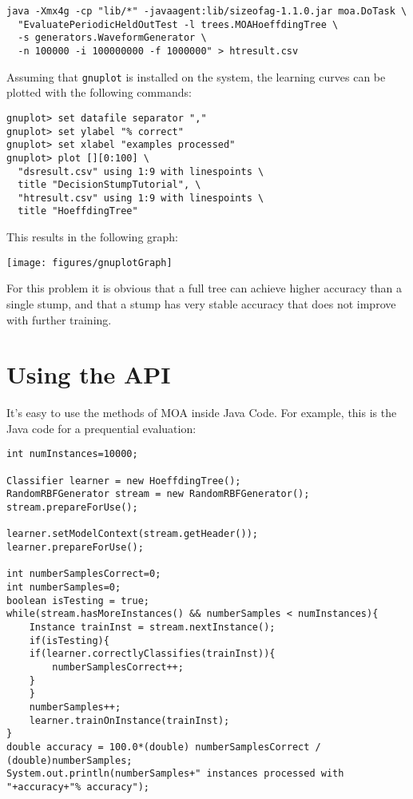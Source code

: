\documentclass[a4paper,12pt,twoside]{book}
\begin{document}
\begin{footnotesize}\begin{verbatim}
java -Xmx4g -cp "lib/*" -javaagent:lib/sizeofag-1.1.0.jar moa.DoTask \
  "EvaluatePeriodicHeldOutTest -l trees.MOAHoeffdingTree \
  -s generators.WaveformGenerator \
  -n 100000 -i 100000000 -f 1000000" > htresult.csv
\end{verbatim}\end{footnotesize}

Assuming that \verb+gnuplot+ is installed on the system, the learning curves can be plotted with the following commands:

\begin{footnotesize}\begin{verbatim}
gnuplot> set datafile separator ","
gnuplot> set ylabel "% correct"
gnuplot> set xlabel "examples processed"
gnuplot> plot [][0:100] \
  "dsresult.csv" using 1:9 with linespoints \
  title "DecisionStumpTutorial", \
  "htresult.csv" using 1:9 with linespoints \
  title "HoeffdingTree"
\end{verbatim}\end{footnotesize}

This results in the following graph:

\texttt{[image: figures/gnuplotGraph]}

For this problem it is obvious that a full tree can achieve higher accuracy than a single stump, and that a stump has very stable accuracy that does not improve with further training.



\chapter{Using the API} %

It's easy to use the methods of MOA inside Java Code. For example, this is the Java code for a prequential evaluation:

\begin{lstlisting}[caption={Java Code Example},label=lst:fullclassifier]
int numInstances=10000;

Classifier learner = new HoeffdingTree();
RandomRBFGenerator stream = new RandomRBFGenerator();
stream.prepareForUse();

learner.setModelContext(stream.getHeader());
learner.prepareForUse();

int numberSamplesCorrect=0;
int numberSamples=0;
boolean isTesting = true;
while(stream.hasMoreInstances() && numberSamples < numInstances){
    Instance trainInst = stream.nextInstance();
    if(isTesting){
	if(learner.correctlyClassifies(trainInst)){
	    numberSamplesCorrect++;
	}
    }
    numberSamples++;
    learner.trainOnInstance(trainInst);
}
double accuracy = 100.0*(double) numberSamplesCorrect / (double)numberSamples;
System.out.println(numberSamples+" instances processed with "+accuracy+"% accuracy");
\end{lstlisting}
\end{document}
